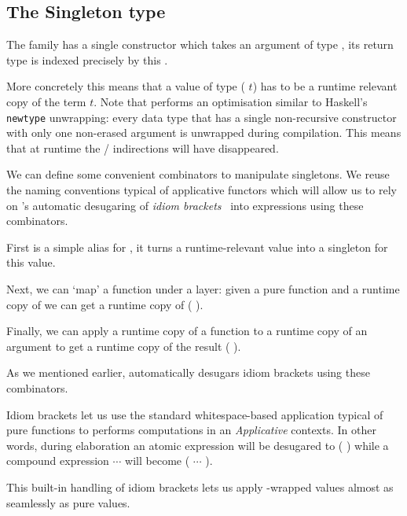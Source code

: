 
\subsection{The Singleton type}\label{sec:datasingleton}

The  family has a single constructor
which takes an argument  of type ,
its return type is indexed precisely by this .


More concretely this means that a value of type
( $t$) has to be a runtime relevant
copy of the term $t$.
%
Note that \idris{} performs an optimisation similar to Haskell's
\texttt{newtype} unwrapping: every data type that has a single
non-recursive constructor with only one non-erased argument
is unwrapped during compilation.
%
This means that at runtime the
 /  indirections
will have disappeared.

We can define some convenient combinators to manipulate
singletons.
%
We reuse the naming conventions typical of applicative
functors which will allow us to rely on \idris{}'s automatic
desugaring of \emph{idiom brackets}~\citep{DBLP:journals/jfp/McbrideP08}
into expressions using these combinators.

First  is a simple alias for ,
it turns a runtime-relevant value  into a singleton for
this value.


Next, we can `map' a function under a  layer: given
a pure function  and a runtime copy of  we
can get a runtime copy of ( ).


Finally, we can apply a runtime copy of a function 
to a runtime copy of an argument 
to get a runtime copy of the result ( ).


As we mentioned earlier, \idris{} automatically desugars idiom brackets
using these combinators.

\begin{remark}
  Idiom brackets let us use the standard whitespace-based application
  typical of pure functions to performs computations in an \emph{Applicative}
  contexts.
%
  In other words, during elaboration an atomic expression
  \IdrisKeyword{[|}  \IdrisKeyword{|]}
  will be desugared to ( )
  while a compound expression
  \IdrisKeyword{[|}   $\cdots$  \IdrisKeyword{|]}
  will become ( \IdrisFunction{<\$>}  \IdrisFunction{<*>} $\cdots$ \IdrisFunction{<*>} ).
\end{remark}

This built-in handling of idiom brackets lets us apply
-wrapped values almost as seamlessly
as pure values.
